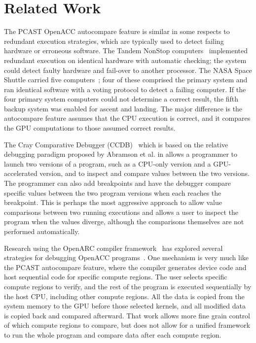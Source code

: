 \section{Related Work}


The PCAST OpenACC autocompare feature is similar in some respects to redundant execution strategies, which are typically used to detect failing hardware or erroneous software.
The Tandem NonStop computers~\cite{bartlett.tandem.86} implemented redundant execution on identical hardware with automatic checking; the system could detect faulty hardware and fail-over to another processor.
The NASA Space Shuttle carried five computers~\cite{fraser.astro.74}; four of these comprised the primary system and ran identical software with a voting protocol to detect a failing computer.
If the four primary system computers could not determine a correct result, the fifth backup system was enabled for ascent and landing.
The major difference is the autocompare feature assumes that the CPU execution is correct, and it compares the GPU computations to those assumed correct results.

The Cray Comparative Debugger (CCDB)~\cite{derose.sc.15} which is based on the relative debugging paradigm proposed by Abramson et al. in \cite{abramson1994relative}\cite{abramson1996relative} allows a programmer to launch two versions of a program, such as a CPU-only version and a GPU-accelerated version, and to inspect and compare values between the two versions.
The programmer can also add breakpoints and have the debugger compare specific values between the two program versions when each reaches the breakpoint.
This is perhaps the most aggressive approach to allow value comparisons between two running executions and allows a user to inspect the program when the values diverge, although the comparisons themselves are not performed automatically.

Research using the OpenARC compiler framework~\cite{lee.hpdc.14} has explored several strategies for debugging OpenACC programs~\cite{lee.ipdps.14}.
One mechanism is very much like the PCAST autocompare feature, where the compiler generates device code and host sequential code for specific compute regions.
The user selects specific compute regions to verify, and the rest of the program is executed sequentially by the host CPU, including other compute regions.
All the data is copied from the system memory to the GPU before those selected kernels, and all modified data is copied back and compared afterward.
That work allows more fine grain control of which compute regions to compare, but does not allow for a unified framework to run the whole program and compare data after each compute region.

